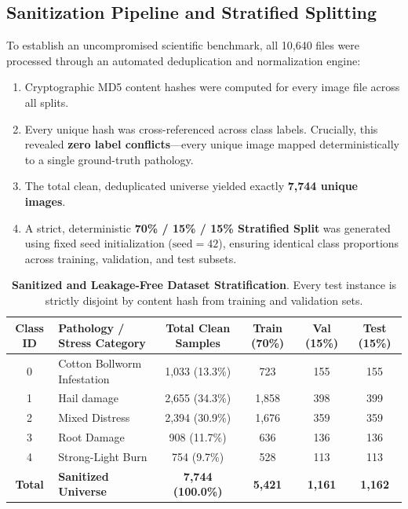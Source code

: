 \documentclass[11pt,a4paper]{article}
\begin{document}
\subsection{Sanitization Pipeline and Stratified Splitting}
To establish an uncompromised scientific benchmark, all 10,640 files were processed through an automated deduplication and normalization engine:
\begin{enumerate}
    \item Cryptographic MD5 content hashes were computed for every image file across all splits.
    \item Every unique hash was cross-referenced across class labels. Crucially, this revealed \textbf{zero label conflicts}---every unique image mapped deterministically to a single ground-truth pathology.
    \item The total clean, deduplicated universe yielded exactly \textbf{7,744 unique images}.
    \item A strict, deterministic \textbf{70\% / 15\% / 15\% Stratified Split} was generated using fixed seed initialization ($\text{seed}=42$), ensuring identical class proportions across training, validation, and test subsets.
\end{enumerate}

\begin{table}[htbp]
\centering
\small
{}
\setlength{\tabcolsep}{5pt}
\begin{tabularx}{\textwidth}{c>{\raggedright\arraybackslash}Xcccc}
\toprule
\rowcolor{SoftSand}
\textbf{Class ID} & \textbf{Pathology / Stress Category} & \textbf{Total Clean Samples} & \textbf{Train (70\%)} & \textbf{Val (15\%)} & \textbf{Test (15\%)} \\
\midrule
0 & Cotton Bollworm Infestation & 1,033 (13.3\%) & 723 & 155 & 155 \\
1 & Hail damage & 2,655 (34.3\%) & 1,858 & 398 & 399 \\
2 & Mixed Distress & 2,394 (30.9\%) & 1,676 & 359 & 359 \\
3 & Root Damage & 908 (11.7\%) & 636 & 136 & 136 \\
4 & Strong-Light Burn & 754 (9.7\%) & 528 & 113 & 113 \\
\midrule
\rowcolor{SoftSand}
\textbf{Total} & \textbf{Sanitized Universe} & \textbf{7,744 (100.0\%)} & \textbf{5,421} & \textbf{1,161} & \textbf{1,162} \\
\bottomrule
\end{tabularx}
\caption{\textbf{Sanitized and Leakage-Free Dataset Stratification}. Every test instance is strictly disjoint by content hash from training and validation sets.}
\label{tab:splits}
\end{table}
\end{document}
